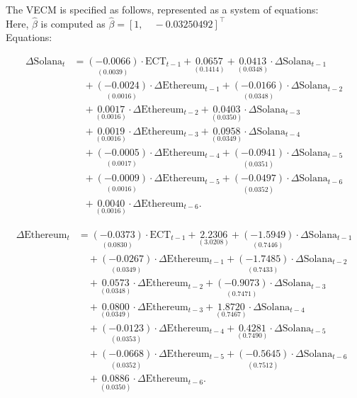 \noindent The VECM is specified as follows, represented as a system of equations:\\
Here, $\hat{\beta}$ is computed as $\hat{\beta} =[1, \quad -0.03250492 ]^\top$
\\
Equations:

\begin{align*}
\Delta \text{Solana}_t &= 
\underset{(0.0039)}{(-0.0066)} \cdot \text{ECT}_{t-1} + 
\underset{(0.1414)}{0.0657} + 
\underset{(0.0348)}{0.0413} \cdot \Delta \text{Solana}_{t-1} \\
&\quad + \underset{(0.0016)}{(-0.0024)} \cdot \Delta \text{Ethereum}_{t-1} + 
\underset{(0.0348)}{(-0.0166)} \cdot \Delta \text{Solana}_{t-2} \\
&\quad + \underset{(0.0016)}{0.0017} \cdot \Delta \text{Ethereum}_{t-2} + 
\underset{(0.0350)}{0.0403} \cdot \Delta \text{Solana}_{t-3} \\
&\quad + \underset{(0.0016)}{0.0019} \cdot \Delta \text{Ethereum}_{t-3} + 
\underset{(0.0349)}{0.0958} \cdot \Delta \text{Solana}_{t-4} \\
&\quad + \underset{(0.0017)}{(-0.0005)} \cdot \Delta \text{Ethereum}_{t-4} + 
\underset{(0.0351)}{(-0.0941)} \cdot \Delta \text{Solana}_{t-5} \\
&\quad + \underset{(0.0016)}{(-0.0009)} \cdot \Delta \text{Ethereum}_{t-5} + 
\underset{(0.0352)}{(-0.0497)} \cdot \Delta \text{Solana}_{t-6} \\
&\quad + \underset{(0.0016)}{0.0040} \cdot \Delta \text{Ethereum}_{t-6}.
\end{align*}

\begin{align*}
\Delta \text{Ethereum}_t &= 
\underset{(0.0830)}{(-0.0373)} \cdot \text{ECT}_{t-1} + 
\underset{(3.0208)}{2.2306} + 
\underset{(0.7446)}{(-1.5949)} \cdot \Delta \text{Solana}_{t-1} \\
&\quad + \underset{(0.0349)}{(-0.0267)} \cdot \Delta \text{Ethereum}_{t-1} + 
\underset{(0.7433)}{(-1.7485)} \cdot \Delta \text{Solana}_{t-2} \\
&\quad + \underset{(0.0348)}{0.0573} \cdot \Delta \text{Ethereum}_{t-2} + 
\underset{(0.7471)}{(-0.9073)} \cdot \Delta \text{Solana}_{t-3} \\
&\quad + \underset{(0.0349)}{0.0800} \cdot \Delta \text{Ethereum}_{t-3} + 
\underset{(0.7467)}{1.8720} \cdot \Delta \text{Solana}_{t-4} \\
&\quad + \underset{(0.0353)}{(-0.0123)} \cdot \Delta \text{Ethereum}_{t-4} + 
\underset{(0.7490)}{0.4281} \cdot \Delta \text{Solana}_{t-5} \\
&\quad + \underset{(0.0352)}{(-0.0668)} \cdot \Delta \text{Ethereum}_{t-5} + 
\underset{(0.7512)}{(-0.5645)} \cdot \Delta \text{Solana}_{t-6} \\
&\quad + \underset{(0.0350)}{0.0886} \cdot \Delta \text{Ethereum}_{t-6}.
\end{align*}

